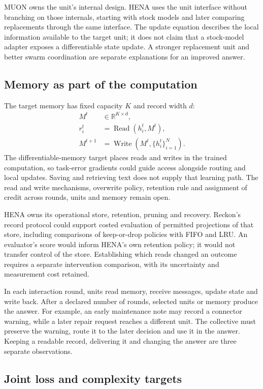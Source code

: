 MUON owns the unit's internal design. HENA uses the unit interface without branching on those internals, starting with stock models and later comparing replacements through the same interface. The update equation describes the local information available to the target unit; it does not claim that a stock-model adapter exposes a differentiable state update. A stronger replacement unit and better swarm coordination are separate explanations for an improved answer.

\subsection{Memory as part of the computation}

The target memory has fixed capacity $K$ and record width $d$:
\begin{align}
 M^t&\in\mathbb{R}^{K\times d},\\
 r_i^t&=\operatorname{Read}(h_i^t,M^t),\\
 M^{t+1}&=\operatorname{Write}(M^t,\{h_i^t\}_{i=1}^N).
\end{align}
The differentiable-memory target places reads and writes in the trained computation, so task-error gradients could guide access alongside routing and local updates. Saving and retrieving text does not supply that learning path. The read and write mechanisms, overwrite policy, retention rule and assignment of credit across rounds, units and memory remain open.

HENA owns its operational store, retention, pruning and recovery. Reckon's record protocol could support costed evaluation of permitted projections of that store, including comparisons of keep-or-drop policies with FIFO and LRU. An evaluator's score would inform HENA's own retention policy; it would not transfer control of the store. Establishing which reads changed an outcome requires a separate intervention comparison, with its uncertainty and measurement cost retained.

In each interaction round, units read memory, receive messages, update state and write back. After a declared number of rounds, selected units or memory produce the answer. For example, an early maintenance note may record a connector warning, while a later repair request reaches a different unit. The collective must preserve the warning, route it to the later decision and use it in the answer. Keeping a readable record, delivering it and changing the answer are three separate observations.

\subsection{Joint loss and complexity targets}

